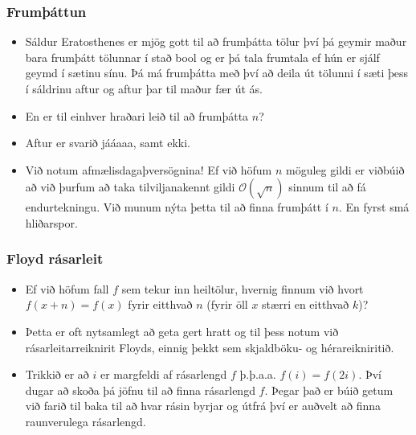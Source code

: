 \documentclass{beamer}
\begin{document}
\begin{frame}
\frametitle{Frumþáttun}

\begin{itemize}

\item<1-> Sáldur Eratosthenes er mjög gott til að frumþátta tölur því þá geymir maður bara frumþátt tölunnar í stað bool og er þá tala frumtala ef hún er sjálf geymd í sætinu sínu. Þá má frumþátta með því að deila út tölunni í sæti þess í sáldrinu aftur og aftur þar til maður fær út ás.

\item<2-> En er til einhver hraðari leið til að frumþátta $n$?

\item<3-> Aftur er svarið jááaaa, samt ekki.

\item<4-> Við notum afmælisdagaþversögnina! Ef við höfum $n$ möguleg gildi er viðbúið að við þurfum að taka tilviljanakennt gildi $\mathcal{O}(\sqrt{n})$ sinnum til að fá endurtekningu. Við munum nýta þetta til að finna frumþátt í $n$. En fyrst smá hliðarspor.

\end{itemize}

\end{frame}

\begin{frame}
\frametitle{Floyd rásarleit}

\begin{itemize}

\item<1-> Ef við höfum fall $f$ sem tekur inn heiltölur, hvernig finnum við hvort $f(x + n) = f(x)$ fyrir eitthvað $n$ (fyrir öll $x$ stærri en eitthvað $k$)?

\item<2-> Þetta er oft nytsamlegt að geta gert hratt og til þess notum við rásarleitarreiknirit Floyds, einnig þekkt sem skjaldböku- og hérareikniritið.

\item<3-> Trikkið er að $i$ er margfeldi af rásarlengd $f$ þ.þ.a.a. $f(i) = f(2i)$. Því dugar að skoða þá jöfnu til að finna rásarlengd $f$. Þegar það er búið getum við farið til baka til að hvar rásin byrjar og útfrá því er auðvelt að finna raunverulega rásarlengd.

\end{itemize}

\end{frame}
\end{document}
